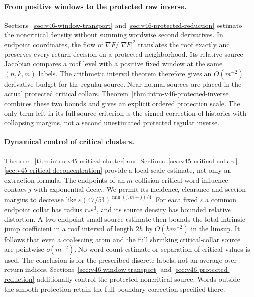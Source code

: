 \documentclass[11pt,reqno]{amsart}
\numberwithin{equation}{section}
\theoremstyle{definition}\newtheorem{definition}[theorem]{Definition}
\theoremstyle{remark}\newtheorem{remark}[theorem]{Remark}
\begin{document}
\paragraph{From positive windows to the protected raw inverse.}
Sections~\ref{sec:v46-window-transport} and
\ref{sec:v46-protected-reduction} estimate the noncritical density
without summing wordwise second derivatives. In endpoint coordinates,
the flow of $\nabla F/|\nabla F|^2$ translates the roof exactly and
preserves every return decision on a protected neighborhood. Its
relative source Jacobian compares a roof level with a positive fixed
window at the same $(n,k,m)$ labels. The arithmetic interval theorem
therefore gives an $O(m^{-2})$ derivative budget for the regular source.
Near-normal sources are placed in the actual protected critical collars.
Theorem~\ref{thm:intro-v46-protected-inverse} combines these two bounds
and gives an explicit ordered protection scale. The only term left in
its full-source criterion is the signed correction of histories with
collapsing margins, not a second unestimated protected regular inverse.

\paragraph{Dynamical control of critical clusters.}
Theorem~\ref{thm:intro-v45-critical-cluster} and
Sections~\ref{sec:v45-critical-collars}--\ref{sec:v45-critical-deconcentration}
provide a local-scale estimate, not only an extraction formula.
The endpoints of an $m$-collision critical word influence contact $j$
with exponential decay. We permit its incidence, clearance and section
margins to decrease like $\varepsilon(47/53)^{\min(j,m-j)/4}$.
For each fixed $\varepsilon$ a common endpoint collar has radius
$r_*\varepsilon^3$, and its source density has bounded relative
distortion. A two-endpoint small-source estimate then bounds the total
intrinsic jump coefficient in a roof interval of length $2h$ by
$O(hm^{-2})$ in the limsup. It follows that even a coalescing atom and
the full shrinking critical-collar source are pointwise $o(m^{-2})$.
No word-count estimate or separation of critical values is used. The
conclusion is for the prescribed discrete labels, not an average over
return indices. Sections~\ref{sec:v46-window-transport} and
\ref{sec:v46-protected-reduction} additionally control the protected
noncritical source. Words outside the smooth protection retain the
full boundary correction specified there.
\end{document}
